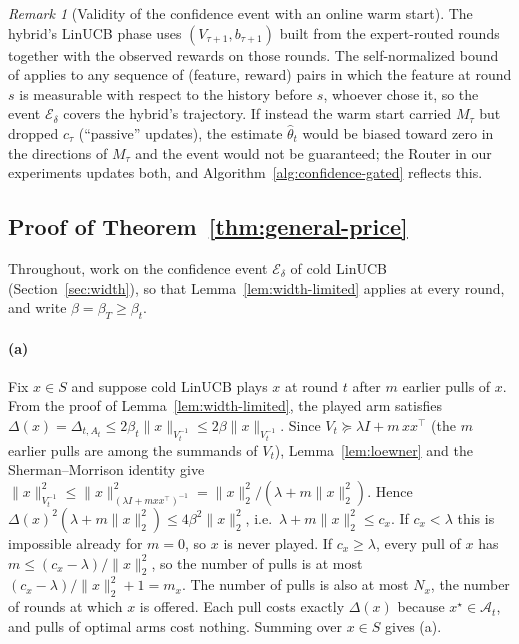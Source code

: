\documentclass{article}
\theoremstyle{definition}
\theoremstyle{remark}
\newtheorem{remark}{Remark}
\theoremstyle{remark}
\begin{document}
\begin{remark}[Validity of the confidence event with an online warm start]
The hybrid's LinUCB phase uses $(V_{\tau+1},b_{\tau+1})$ built from the
expert-routed rounds together with the observed rewards on those rounds. The
self-normalized bound of \cite{abbasi2011improved} applies to any sequence of
(feature, reward) pairs in which the feature at round $s$ is measurable with
respect to the history before $s$, whoever chose it, so the event
$\mathcal E_\delta$ covers the hybrid's trajectory. If instead the warm start
carried $M_\tau$ but dropped $c_\tau$ (``passive'' updates), the estimate
$\widehat\theta_t$ would be biased toward zero in the directions of $M_\tau$
and the event would not be guaranteed; the Router in our experiments updates
both, and Algorithm~\ref{alg:confidence-gated} reflects this.
\end{remark}

\subsection{Proof of Theorem~\ref{thm:general-price}}
\label{app:proof-general-price}

Throughout, work on the confidence event $\mathcal E_\delta$ of cold LinUCB
(Section~\ref{sec:width}), so that Lemma~\ref{lem:width-limited} applies at
every round, and write $\beta=\beta_T\ge\beta_t$.

\paragraph{(a)}
Fix $x\in S$ and suppose cold LinUCB plays $x$ at round $t$ after $m$ earlier
pulls of $x$. From the proof of Lemma~\ref{lem:width-limited}, the played arm
satisfies $\Delta(x)=\Delta_{t,A_t}\le2\beta_t\|x\|_{V_t^{-1}}\le2\beta\|x\|_{V_t^{-1}}$.
Since $V_t\succeq\lambda I+m\,xx^\top$ (the $m$ earlier pulls are among the
summands of $V_t$), Lemma~\ref{lem:loewner} and the Sherman--Morrison identity
give $\|x\|^2_{V_t^{-1}}\le\|x\|^2_{(\lambda I+mxx^\top)^{-1}}=\|x\|_2^2/(\lambda+m\|x\|_2^2)$.
Hence $\Delta(x)^2(\lambda+m\|x\|_2^2)\le4\beta^2\|x\|_2^2$, i.e.\
$\lambda+m\|x\|_2^2\le c_x$. If $c_x<\lambda$ this is impossible already for
$m=0$, so $x$ is never played. If $c_x\ge\lambda$, every pull of $x$ has
$m\le(c_x-\lambda)/\|x\|_2^2$, so the number of pulls is at most
$(c_x-\lambda)/\|x\|_2^2+1=m_x$. The number of pulls is also at most $N_x$,
the number of rounds at which $x$ is offered. Each pull costs exactly
$\Delta(x)$ because $x^\star\in\mathcal A_t$, and pulls of optimal arms cost
nothing. Summing over $x\in S$ gives (a).
\end{document}
